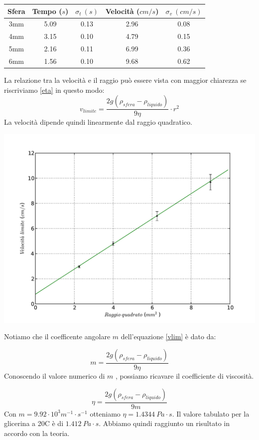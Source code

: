 \begin{center}
\begin{tabular}{c|c|c|c|c}
Sfera & Tempo ($s$) & $\sigma_t\ (s) $ & Velocità ($cm/s$) & $\sigma_v \ (cm/s) $\\
\midrule
3mm & 5.09 & 0.13 & 2.96 & 0.08\\
4mm & 3.15 & 0.10 & 4.79 & 0.15\\
5mm & 2.16 & 0.11 & 6.99 & 0.36\\
6mm & 1.56 & 0.10 & 9.68 & 0.62\\
\end{tabular}
\end{center}
La relazione tra la velocità e il raggio può essere vista con maggior chiarezza se riscriviamo \ref{eta}  in questo modo: 
\begin{equation}\label{vlim}
v_{limite}=  \frac{2g(\rho_{sfera} - \rho_{liquido})}{9 \eta} \cdot r^2
\end{equation}
La velocità dipende quindi linearmente dal raggio quadratico.
\begin{center}
\includegraphics[scale=0.75]{../grafici/velocita.pdf}
\end{center}


Notiamo che il coefficente angolare $m$ dell'equazione \ref{vlim} è dato da:

\begin{equation}
m= \frac{2g(\rho_{sfera} - \rho_{liquido})}{9 \eta}
\end{equation}
Conoscendo il valore numerico di $m$ , possiamo ricavare il coefficiente di viscosità.

\begin{equation}
\eta = \frac{2g(\rho_{sfera} - \rho_{liquido})}{9 m}
\end{equation}
Con $m = 9.92 \cdot 10^{3} m^{-1}\cdot s^{-1}$ otteniamo  $\eta = 1.4344 \ Pa \cdot s$. 
Il valore tabulato per la glicerina a 20C  è di $1.412\ Pa \cdot s$. Abbiamo quindi raggiunto un risultato in accordo con la teoria. 

